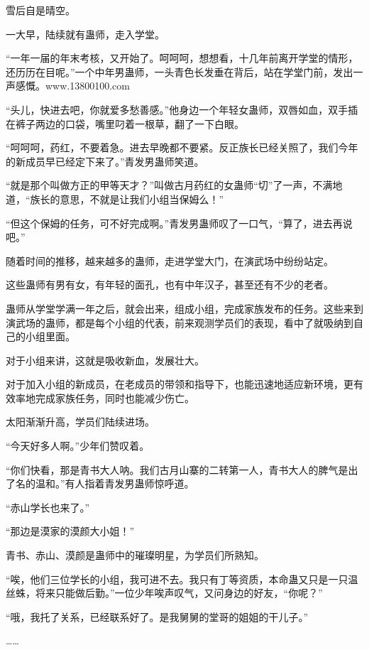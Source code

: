 
\begin{this_body}

雪后自是晴空。

一大早，陆续就有蛊师，走入学堂。

“一年一届的年末考核，又开始了。呵呵呵，想想看，十几年前离开学堂的情形，还历历在目呢。”一个中年男蛊师，一头青色长发垂在背后，站在学堂门前，发出一声感慨。www.13800100.com

“头儿，快进去吧，你就爱多愁善感。”他身边一个年轻女蛊师，双唇如血，双手插在裤子两边的口袋，嘴里叼着一根草，翻了一下白眼。

“呵呵呵，药红，不要着急。进去早晚都不要紧。反正族长已经关照了，我们今年的新成员早已经定下来了。”青发男蛊师笑道。

“就是那个叫做方正的甲等天才？”叫做古月药红的女蛊师“切”了一声，不满地道，“族长的意思，不就是让我们小组当保姆么！”

“但这个保姆的任务，可不好完成啊。”青发男蛊师叹了一口气，“算了，进去再说吧。”

随着时间的推移，越来越多的蛊师，走进学堂大门，在演武场中纷纷站定。

这些蛊师有男有女，有年轻的面孔，也有中年汉子，甚至还有不少的老者。

蛊师从学堂学满一年之后，就会出来，组成小组，完成家族发布的任务。这些来到演武场的蛊师，都是每个小组的代表，前来观测学员们的表现，看中了就吸纳到自己的小组里面。

对于小组来讲，这就是吸收新血，发展壮大。

对于加入小组的新成员，在老成员的带领和指导下，也能迅速地适应新环境，更有效率地完成家族任务，同时也能减少伤亡。

太阳渐渐升高，学员们陆续进场。

“今天好多人啊。”少年们赞叹着。

“你们快看，那是青书大人呐。我们古月山寨的二转第一人，青书大人的脾气是出了名的温和。”有人指着青发男蛊师惊呼道。

“赤山学长也来了。”

“那边是漠家的漠颜大小姐！”

青书、赤山、漠颜是蛊师中的璀璨明星，为学员们所熟知。

“唉，他们三位学长的小组，我可进不去。我只有丁等资质，本命蛊又只是一只温丝蛛，将来只能做后勤。”一位少年唉声叹气，又问身边的好友，“你呢？”

“哦，我托了关系，已经联系好了。是我舅舅的堂哥的姐姐的干儿子。”

……


\end{this_body}
